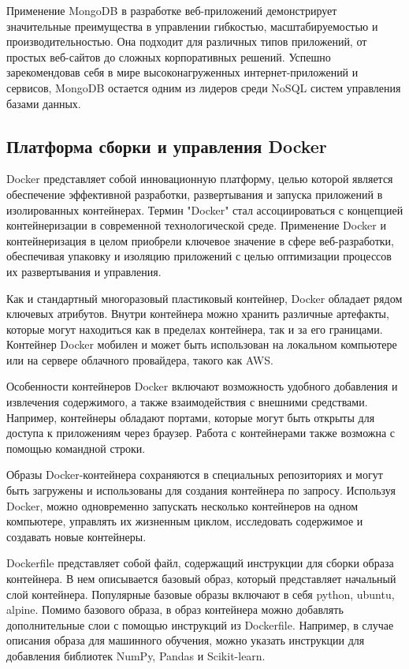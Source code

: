 \documentclass[master, och, diploma]{SCWorks}
\begin{document}
Применение MongoDB в разработке веб-приложений демонстрирует значительные преимущества в управлении гибкостью, масштабируемостью и производительностью. Она подходит для различных типов приложений, от простых веб-сайтов до сложных корпоративных решений. Успешно зарекомендовав себя в мире высоконагруженных интернет-приложений и сервисов, MongoDB остается одним из лидеров среди NoSQL систем управления базами данных.



\subsection{Платформа сборки и управления Docker}
Docker представляет собой инновационную платформу, целью которой является обеспечение эффективной разработки, развертывания и запуска приложений в изолированных контейнерах. Термин "Docker" стал ассоциироваться с концепцией контейнеризации в современной технологической среде. Применение Docker и контейнеризация в целом приобрели ключевое значение в сфере веб-разработки, обеспечивая упаковку и изоляцию приложений с целью оптимизации процессов их развертывания и управления\cite{Beloded_2023}.

Как и стандартный многоразовый пластиковый контейнер, Docker обладает рядом ключевых атрибутов. Внутри контейнера можно хранить различные артефакты, которые могут находиться как в пределах контейнера, так и за его границами. Контейнер Docker мобилен и может быть использован на локальном компьютере или на сервере облачного провайдера, такого как AWS.

Особенности контейнеров Docker включают возможность удобного добавления и извлечения содержимого, а также взаимодействия с внешними средствами. Например, контейнеры обладают портами, которые могут быть открыты для доступа к приложениям через браузер. Работа с контейнерами также возможна с помощью командной строки.

Образы Docker-контейнера сохраняются в специальных репозиториях и могут быть загружены и использованы для создания контейнера по запросу. Используя Docker, можно одновременно запускать несколько контейнеров на одном компьютере, управлять их жизненным циклом, исследовать содержимое и создавать новые контейнеры.

Dockerfile представляет собой файл, содержащий инструкции для сборки образа контейнера. В нем описывается базовый образ, который представляет начальный слой контейнера. Популярные базовые образы включают в себя python, ubuntu, alpine. Помимо базового образа, в образ контейнера можно добавлять дополнительные слои с помощью инструкций из Dockerfile. Например, в случае описания образа для машинного обучения, можно указать инструкции для добавления библиотек NumPy, Pandas и Scikit-learn.
\end{document}

